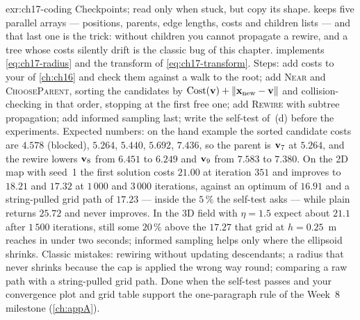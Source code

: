 
\begin{solution}{exr:ch17-coding}
Checkpoints; read  only when stuck, but copy its shape.
 keeps five parallel arrays --- positions, parents, edge lengths, costs and
children lists --- and that last one is the trick: without children you cannot propagate a
rewire, and a tree whose costs silently drift is the classic bug of this chapter.
 implements \cref{eq:ch17-radius} and  the
transform of \cref{eq:ch17-transform}. Steps: add costs to your \rrt of \cref{ch:ch16} and
check them against a walk to the root; add \textsc{Near} and \textsc{ChooseParent},
sorting the candidates by $\mathrm{Cost}(\mathbf{v})+\left\lVert \mathbf{x}_{\mathrm{new}}-\mathbf{v} \right\rVert$
and collision-checking in that order, stopping at the first free one; add \textsc{Rewire}
with subtree propagation; add informed sampling last; write the self-test of~(d) before
the experiments. Expected numbers: on the hand example the sorted candidate costs are
$4.578$ (blocked), $5.264$, $5.440$, $5.692$, $7.436$, so the parent is $\mathbf{v}_7$ at
$5.264$, and the rewire lowers $\mathbf{v}_8$ from $6.451$ to $6.249$ and $\mathbf{v}_9$ from
$7.583$ to $7.380$. On the 2D map with seed~1 the first solution costs $21.00$ at
iteration $351$ and improves to $18.21$ and $17.32$ at $1\,000$ and $3\,000$ iterations,
against an optimum of $16.91$ and a string-pulled grid path of $17.23$ --- inside the
$5\,\%$ the self-test asks --- while plain \rrt returns $25.72$ and never improves. In the
3D field with $\eta=1.5$ expect about $21.1$ after $1\,500$ iterations, still some
$20\,\%$ above the $17.27$ that grid \astar at $h=0.25$~m reaches in under two seconds;
informed sampling helps only where the ellipsoid shrinks. Classic mistakes: rewiring
without updating descendants; a radius that never shrinks because the cap is applied the
wrong way round; comparing a raw \rrtstar path with a string-pulled grid path. Done when
the self-test passes and your convergence plot and grid table support the one-paragraph
rule of the Week~8 milestone (\cref{ch:appA}).
\end{solution}
